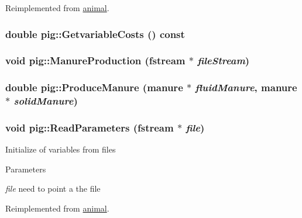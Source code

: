 Reimplemented from \hyperlink{classanimal_a99d20eac6b06d781c35cf3f6fa9f5139}{animal}.\hypertarget{classpig_aee9f42652f0f9a71fdcc5b65df555a97}{
\subsubsection[{GetvariableCosts}]{\setlength{\rightskip}{0pt plus 5cm}double pig::GetvariableCosts () const}}
\label{classpig_aee9f42652f0f9a71fdcc5b65df555a97}
\hypertarget{classpig_a3f4680b212a968f2e69c75b17dbd1010}{
\subsubsection[{ManureProduction}]{\setlength{\rightskip}{0pt plus 5cm}void pig::ManureProduction (fstream $\ast$ {\em fileStream})}}
\label{classpig_a3f4680b212a968f2e69c75b17dbd1010}
\hypertarget{classpig_af55a83b472d29ba2a254bd1ed6e2c4b5}{
\subsubsection[{ProduceManure}]{\setlength{\rightskip}{0pt plus 5cm}double pig::ProduceManure ({\bf manure} $\ast$ {\em fluidManure}, \/  {\bf manure} $\ast$ {\em solidManure})}}
\label{classpig_af55a83b472d29ba2a254bd1ed6e2c4b5}
\hypertarget{classpig_a43fbf15dc40e35fbfd5939c1748ff71b}{
\subsubsection[{ReadParameters}]{\setlength{\rightskip}{0pt plus 5cm}void pig::ReadParameters (fstream $\ast$ {\em file})}}
\label{classpig_a43fbf15dc40e35fbfd5939c1748ff71b}
Initialize of variables from files 
\begin{DoxyParams}{Parameters}
\item[{\em file}]need to point a the file \end{DoxyParams}


Reimplemented from \hyperlink{classanimal_ad7a71ab5ae87becfa921f70501cf4ee1}{animal}.

